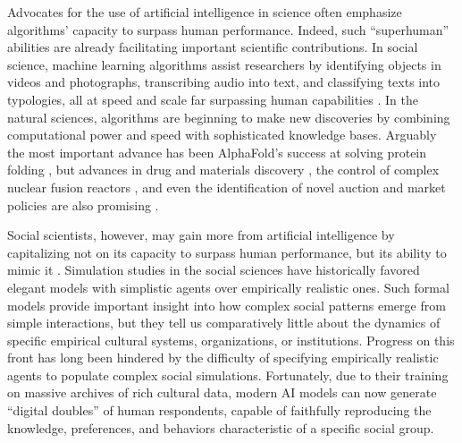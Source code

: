 \documentclass{article} %
\begin{document}
Advocates for the use of artificial intelligence in science often
emphasize algorithms' capacity to surpass human performance. Indeed,
such ``superhuman'' abilities are already facilitating important
scientific contributions. In social science, machine learning algorithms
assist researchers by identifying objects in videos and photographs,
transcribing audio into text, and classifying texts into typologies, all
at speed and scale far surpassing human capabilities
\parencite{Bonikowski2022-th, Grimmer2022-fu, Hannan2022-bs, Le_Mens2023-wa, Vicinanza_undated-cj}. In the
natural sciences, algorithms are beginning to make new discoveries by
combining computational power and speed with sophisticated knowledge
bases. Arguably the most important advance has been AlphaFold's success
at solving protein folding \parencite{Senior2020-ee}, but advances in drug \parencite{Jimenez-Luna2020-tg} and materials discovery
\parencite{Wilkins2023-mx, Zhou2018-cw}, the control of complex nuclear fusion reactors
\parencite{Degrave2022-zi}, and
even the identification of novel auction and market policies are also
promising \parencite{Jiao2021-mb, Mosavi2020-hy}.

Social scientists, however, may gain more from artificial intelligence
by capitalizing not on its capacity to surpass human performance, but
its ability to mimic it
\parencite{Brynjolfsson2023-yu, Sourati2023-aa}. Simulation studies in the social sciences have
historically favored elegant models with simplistic agents over
empirically realistic ones. Such formal models provide important insight
into how complex social patterns emerge from simple interactions, but
they tell us comparatively little about the dynamics of specific
empirical cultural systems, organizations, or institutions. Progress on
this front has long been hindered by the difficulty of specifying
empirically realistic agents to populate complex social simulations.
Fortunately, due to their training on massive archives of rich cultural
data, modern AI models can now generate ``digital doubles'' of human
respondents, capable of faithfully reproducing the knowledge,
preferences, and behaviors characteristic of a specific social group.
\end{document}
